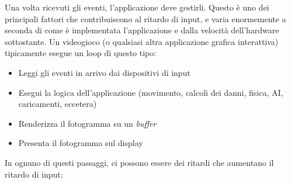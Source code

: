 Una volta ricevuti gli eventi, l'applicazione deve gestirli. Questo è uno dei principali fattori che contribuiscono al ritardo di input, e varia enormemente a seconda di come è implementata l'applicazione e dalla velocità dell'hardware sottostante. Un videogioco (o qualsiasi altra applicazione grafica interattiva) tipicamente esegue un loop di questo tipo:
\begin{itemize}
	\item Leggi gli eventi in arrivo dai dispositivi di input
	\item Esegui la logica dell'applicazione (movimento, calcoli dei danni, fisica, AI, caricamenti, eccetera)
	\item Renderizza il fotogramma su un \textit{buffer}
	\item Presenta il fotogramma sul display
\end{itemize}
In ognuno di questi passaggi, ci possono essere dei ritardi che aumentano il ritardo di input:
